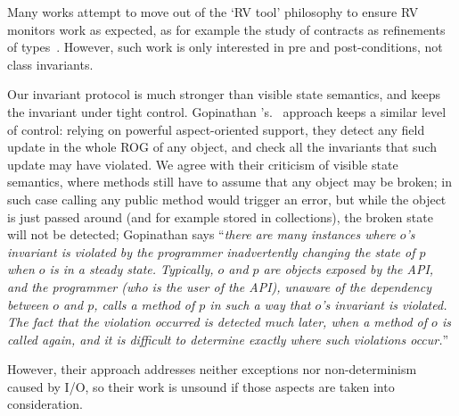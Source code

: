 Many works attempt to move out of the `RV tool' philosophy to ensure RV monitors work as expected, as for example
the study of contracts as refinements of types~\cite{findler2001contract}.
However, such work is only interested in pre and post-conditions, not class invariants.

Our invariant protocol is much stronger than
visible state semantics, and keeps the invariant under tight control.
Gopinathan \etal's.~\cite{Gopinathan:2008:RMO:1483018.1483028} approach keeps
a similar level of control:
relying on powerful aspect-oriented support, they detect any field update in the whole ROG of any object, and check all the invariants that such update may have violated.
We agree with their criticism of visible state semantics, where  methods still have to assume that any object may be broken; in such case calling any public method would trigger an error, but while the object is just passed around (and for example stored in collections), the broken state will not be detected; Gopinathan \etal says ``\emph{there are many instances where $o$'s invariant is violated by the programmer inadvertently changing the state of $p$ when $o$ is in a steady state. Typically, $o$ and $p$ are objects exposed by the API, and the programmer (who is the user of the API), unaware of the dependency between $o$ and $p$, calls a method of $p$ in such a way that $o$'s invariant is violated. The fact that the violation occurred is detected much later, when a method of $o$ is called again, and it is difficult to determine exactly where such violations occur.}''

However, their approach addresses neither exceptions nor non-determinism caused by I/O, so their work is unsound if those aspects are taken into consideration.


